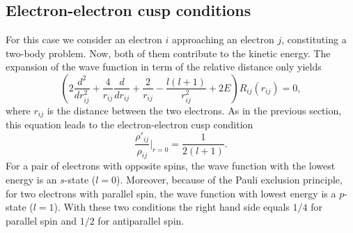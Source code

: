 \subsection{Electron-electron cusp conditions}
For this case we consider an electron $i$ approaching an electron $j$, constituting a two-body problem. Now, both of them contribute to the kinetic energy. The expansion of the wave function in term of the relative distance only yields
\begin{equation}
 \left(2\frac{d^2}{dr_{ij}^2} + \frac{4}{r_{ij}} \frac{d}{dr_{ij}} + \frac{2}{r_{ij}} - \frac{l(l+1)}{r_{ij}^2} + 2E \right) R_{ij}(r_{ij}) = 0,
\end{equation}
where $r_{ij}$ is the distance between the two electrons. As in the previous section, this equation leads to the electron-electron cusp condition
\begin{equation}
 \boxed{\frac{\rho{'}_{ij}}{\rho_{ij}}\Big|_{r=0} = \frac{1}{2(l+1)}.}
\end{equation}
For a pair of electrons with opposite spins, the wave function with the lowest energy is an $s$-state ($l=0$). Moreover, because of the Pauli exclusion principle, for two electrons with parallel spin, the wave function with lowest energy is a $p$-state  ($l=1$).  With these two conditions the right hand side equals $1/4$ for parallel spin and $1/2$ for antiparallel spin.


